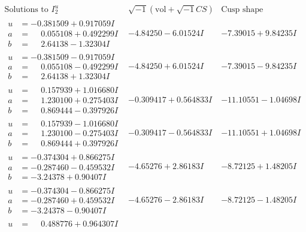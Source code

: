 \documentclass[1p]{elsarticle_modified}
\theoremstyle{definition}
\newcommand{\I}{\sqrt{-1}}
\begin{document}
$$\begin{array}{c|c|c}  
\text{Solutions to }I^u_{2}& \I (\text{vol} + \sqrt{-1}CS) & \text{Cusp shape}\\
 \hline 
\begin{aligned}
u &= -0.381509 + 0.917059 I \\
a &= \phantom{-}0.055108 + 0.492299 I \\
b &= \phantom{-}2.64138 - 1.32304 I\end{aligned}
 & -4.84250 - 6.01524 I & -7.39015 + 9.84235 I \\ \hline\begin{aligned}
u &= -0.381509 - 0.917059 I \\
a &= \phantom{-}0.055108 - 0.492299 I \\
b &= \phantom{-}2.64138 + 1.32304 I\end{aligned}
 & -4.84250 + 6.01524 I & -7.39015 - 9.84235 I \\ \hline\begin{aligned}
u &= \phantom{-}0.157939 + 1.016680 I \\
a &= \phantom{-}1.230100 + 0.275403 I \\
b &= \phantom{-}0.869444 - 0.397926 I\end{aligned}
 & -0.309417 + 0.564833 I & -11.10551 - 1.04698 I \\ \hline\begin{aligned}
u &= \phantom{-}0.157939 - 1.016680 I \\
a &= \phantom{-}1.230100 - 0.275403 I \\
b &= \phantom{-}0.869444 + 0.397926 I\end{aligned}
 & -0.309417 - 0.564833 I & -11.10551 + 1.04698 I \\ \hline\begin{aligned}
u &= -0.374304 + 0.866275 I \\
a &= -0.287460 - 0.459532 I \\
b &= -3.24378 + 0.90407 I\end{aligned}
 & -4.65276 + 2.86183 I & -8.72125 + 1.48205 I \\ \hline\begin{aligned}
u &= -0.374304 - 0.866275 I \\
a &= -0.287460 + 0.459532 I \\
b &= -3.24378 - 0.90407 I\end{aligned}
 & -4.65276 - 2.86183 I & -8.72125 - 1.48205 I \\ \hline\begin{aligned}
u &= \phantom{-}0.488776 + 0.964307 I \\

\end{aligned}
\end{array}$$
\end{document}
